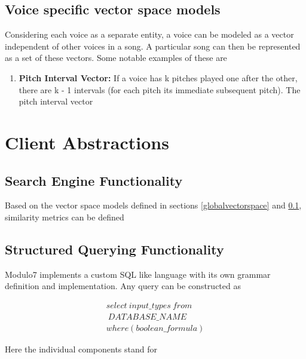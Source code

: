 \documentclass{article}
\begin{document}
\subsection{Voice specific vector space models} \label{voicespecificvectorspace}
 
Considering each voice as a separate entity, a voice can be modeled as a vector independent of other voices in a song. A particular song can then be represented as a set of these vectors. Some notable examples of these are 

\begin{enumerate}
\item \textbf{Pitch Interval Vector:} If a voice has k pitches played one after the other, there are  k - 1 intervals (for each pitch its immediate subsequent pitch). The pitch interval vector 
\end{enumerate}
 
\section{Client Abstractions}

\subsection{Search Engine Functionality} \label{searchengine}

Based on the vector space models defined in sections \ref{globalvectorspace} and
\ref{voicespecificvectorspace}, similarity metrics can be defined 

\subsection{Structured Querying Functionality} \label{structuredquery}

Modulo7 implements a custom SQL like language with its own grammar definition and implementation. Any query can be constructed as 

\begin{equation}
\begin{aligned}
select \ input\_types \ from \\\ DATABASE\_NAME \\ where (boolean\_formula)
\end{aligned}
\end{equation}

Here the individual components stand for 
\end{document}
